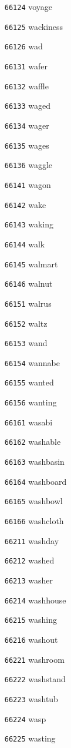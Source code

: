 \documentclass[twoside,11pt]{article}
\begin{document}
\begin{multicols}{5}
\begin{enumerate}
\item[\texttt{66124}] voyage
\item[\texttt{66125}] wackiness
\item[\texttt{66126}] wad
\item[\texttt{66131}] wafer
\item[\texttt{66132}] waffle
\item[\texttt{66133}] waged
\item[\texttt{66134}] wager
\item[\texttt{66135}] wages
\item[\texttt{66136}] waggle
\item[\texttt{66141}] wagon
\item[\texttt{66142}] wake
\item[\texttt{66143}] waking
\item[\texttt{66144}] walk
\item[\texttt{66145}] walmart
\item[\texttt{66146}] walnut
\item[\texttt{66151}] walrus
\item[\texttt{66152}] waltz
\item[\texttt{66153}] wand
\item[\texttt{66154}] wannabe
\item[\texttt{66155}] wanted
\item[\texttt{66156}] wanting
\item[\texttt{66161}] wasabi
\item[\texttt{66162}] washable
\item[\texttt{66163}] washbasin
\item[\texttt{66164}] washboard
\item[\texttt{66165}] washbowl
\item[\texttt{66166}] washcloth
\item[\texttt{66211}] washday
\item[\texttt{66212}] washed
\item[\texttt{66213}] washer
\item[\texttt{66214}] washhouse
\item[\texttt{66215}] washing
\item[\texttt{66216}] washout
\item[\texttt{66221}] washroom
\item[\texttt{66222}] washstand
\item[\texttt{66223}] washtub
\item[\texttt{66224}] wasp
\item[\texttt{66225}] wasting

\end{enumerate}
\end{multicols}
\end{document}
